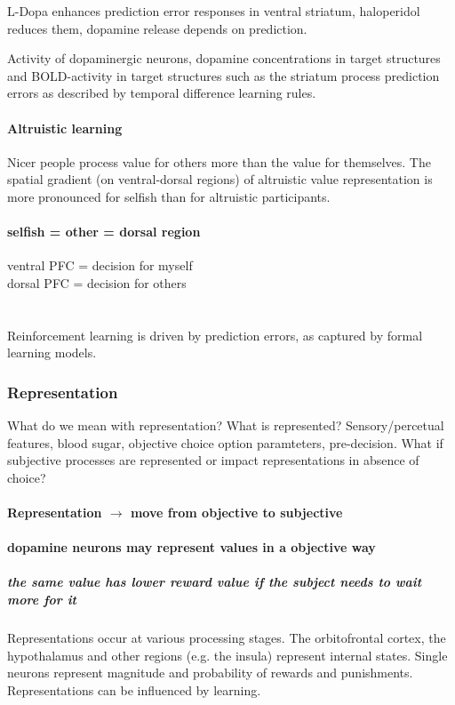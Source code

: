\documentclass[12pt,article,oneside,a4paper]{memoir}
\begin{document}
L-Dopa enhances prediction error responses in ventral striatum, haloperidol
reduces them, dopamine release depends on prediction.

Activity of dopaminergic neurons, dopamine concentrations in target structures
and BOLD-activity in target structures such as the striatum process prediction
errors as described by temporal difference learning rules.

\paragraph{Altruistic learning}
Nicer people process value for others more than the value for themselves. The
spatial gradient (on ventral-dorsal regions) of altruistic value representation
is more pronounced for selfish than for altruistic participants.

\paragraph{selfish = other = dorsal region}
ventral PFC = decision for myself\\
dorsal PFC = decision for others
\\
\\
\\
Reinforcement learning is driven by prediction errors, as captured by formal
learning models.

\subsubsection{Representation}
What do we mean with representation?
What is represented? Sensory/percetual features, blood sugar, objective choice
option paramteters, pre-decision.
What if subjective processes are represented or impact representations in
absence of choice?

\paragraph{Representation $\rightarrow$ move from objective to subjective}
\paragraph{dopamine neurons may represent values in a objective way}
\subparagraph{the same value has lower reward value if the subject needs to
wait more for it}

Representations occur at various processing stages. The orbitofrontal cortex,
the hypothalamus and other regions (e.g. the insula) represent internal states.
Single neurons represent magnitude and probability of rewards and punishments.
Representations can be influenced by learning.
\end{document}
